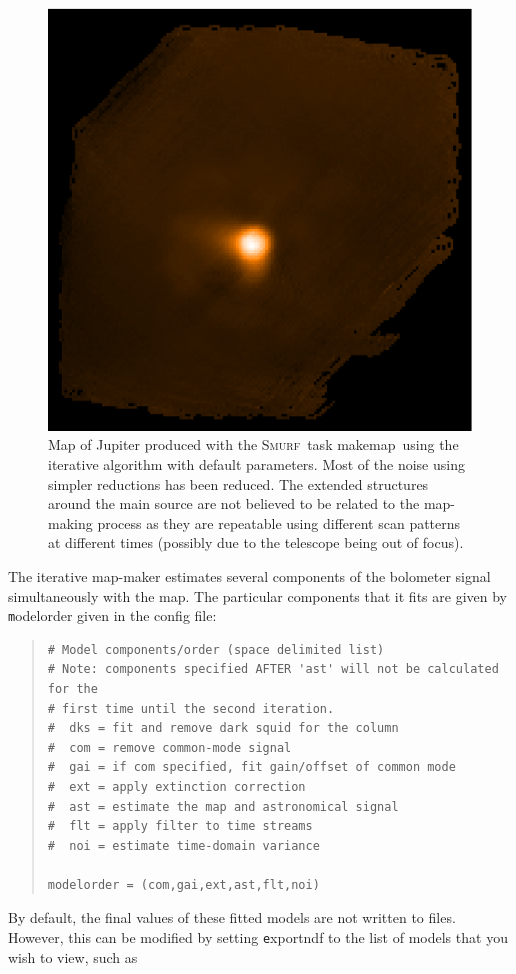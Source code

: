 \documentclass[twoside,11pt]{article}
\newenvironment{myquote}{\begin{quote}\begin{small}}{\end{small}\end{quote}}
\newcommand{\smurf}{\xref{\textsc{Smurf}}{sun258}{}}
\newcommand{\task}[1]{\textsf{#1}}
\newcommand{\makemap}{\xref{\task{makemap}}{sun258}{MAKEMAP}}
\newcommand{\xref}[3]{#1}
\renewcommand{\_}{\texttt{\symbol{95}}}
\begin{document}
\begin{figure}
\begin{center}
\includegraphics[width=0.5\linewidth]{map_iterate.eps}
\caption{Map of Jupiter produced with the \smurf\ task \makemap\ using
  the iterative algorithm with default parameters. Most of the noise
  using simpler reductions has been reduced. The extended structures
  around the main source are not believed to be related to the
  map-making process as they are repeatable using different scan
  patterns at different times (possibly due to the telescope being out
  of focus).}
\label{fig:itermap}
\end{center}
\end{figure}

The iterative map-maker estimates several components of the bolometer
signal simultaneously with the map. The particular components that it
fits are given by {\texttt modelorder} given in the config file:

\begin{myquote}
\begin{verbatim}
# Model components/order (space delimited list)
# Note: components specified AFTER 'ast' will not be calculated for the
# first time until the second iteration.
#  dks = fit and remove dark squid for the column
#  com = remove common-mode signal
#  gai = if com specified, fit gain/offset of common mode
#  ext = apply extinction correction
#  ast = estimate the map and astronomical signal
#  flt = apply filter to time streams
#  noi = estimate time-domain variance

modelorder = (com,gai,ext,ast,flt,noi)
\end{verbatim}
\end{myquote}

By default, the final values of these fitted models are not written to
files. However, this can be modified by setting {\texttt exportndf} to
the list of models that you wish to view, such as
\end{document}
